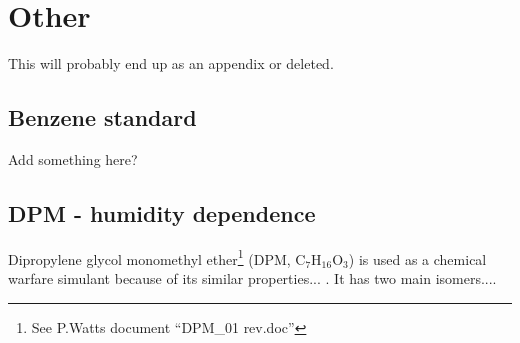 \chapter{Other}
This will probably end up as an appendix or deleted.



\section{Benzene standard}
Add something here?









\section{DPM - humidity dependence}

Dipropylene glycol monomethyl ether\footnote{See P.Watts document ``DPM\_01 rev.doc''} (DPM, C$_7$H$_{16}$O$_3$) is used as a chemical warfare simulant because of its similar properties... \cite{MUIR2004183}. It has two main isomers....

